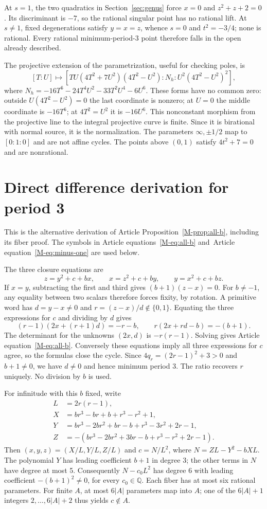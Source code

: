 \documentclass{jT}
\newcommand{\Q}{\mathbb Q}
\begin{document}
At $s=1$, the two quadratics in Section~\ref{sec:genus} force $x=0$ and $z^2+z+2=0$. Its discriminant is $-7$, so the rational singular point has no rational lift. At $s\ne1$, fixed degenerations satisfy $y=x=z$, whence $s=0$ and $t^2=-3/4$; none is rational. Every rational minimum-period-3 point therefore falls in the open already described.

The projective extension of the parametrization, useful for checking poles, is
\[
[T:U]\longmapsto[TU(4T^2+7U^2)(4T^2-U^2):N_h:U^2(4T^2-U^2)^2],
\]
where $N_h=-16T^6-24T^4U^2-33T^2U^4-6U^6$. These forms have no common zero: outside $U(4T^2-U^2)=0$ the last coordinate is nonzero; at $U=0$ the middle coordinate is $-16T^6$; at $4T^2=U^2$ it is $-16U^6$. This nonconstant morphism from the projective line to the integral projective curve is finite. Since it is birational with normal source, it is the normalization. The parameters $\infty,\pm1/2$ map to $[0:1:0]$ and are not affine cycles. The points above $(0,1)$ satisfy $4t^2+7=0$ and are nonrational.

\section{Direct difference derivation for period 3}\label{sup:direct}
This is the alternative derivation of Article Proposition~\ref{M-prop:all-b}, including its fiber proof. The symbols in Article equations~\eqref{M-eq:all-b} and~Article equation~\eqref{M-eq:minus-one} are used below.

The three closure equations are
\[
z=y^2+c+bx,\qquad x=z^2+c+by,\qquad y=x^2+c+bz.
\]
If $x=y$, subtracting the first and third gives $(b+1)(z-x)=0$. For $b\ne-1$, any equality between two scalars therefore forces fixity, by rotation. A primitive word has $d=y-x\ne0$ and $r=(z-x)/d\notin\{0,1\}$. Equating the three expressions for $c$ and dividing by $d$ gives
\[
(r-1)(2x+(r+1)d)=-r-b,\qquad r(2x+rd-b)=-(b+1).
\]
The determinant for the unknowns $(2x,d)$ is $-r(r-1)$. Solving gives Article equation~\eqref{M-eq:all-b}. Conversely these equations imply all three expressions for $c$ agree, so the formulas close the cycle. Since $4q_r=(2r-1)^2+3>0$ and $b+1\ne0$, we have $d\ne0$ and hence minimum period 3. The ratio recovers $r$ uniquely. No division by $b$ is used.

For infinitude with this $b$ fixed, write
\[
\begin{aligned}
L&=2r(r-1),\\
X&=br^3-br+b+r^3-r^2+1,\\
Y&=br^3-2br^2+br-b+r^3-3r^2+2r-1,\\
Z&=-(br^3-2br^2+3br-b+r^3-r^2+2r-1).
\end{aligned}
\]
Then $(x,y,z)=(X/L,Y/L,Z/L)$ and $c=N/L^2$, where $N=ZL-Y^2-bXL$. The polynomial $Y$ has leading coefficient $b+1$ in degree 3; the other terms in $N$ have degree at most 5. Consequently $N-c_0L^2$ has degree 6 with leading coefficient $-(b+1)^2\ne0$, for every $c_0\in\Q$. Each fiber has at most six rational parameters. For finite $A$, at most $6|A|$ parameters map into $A$; one of the $6|A|+1$ integers $2,\ldots,6|A|+2$ thus yields $c\notin A$.
\end{document}

